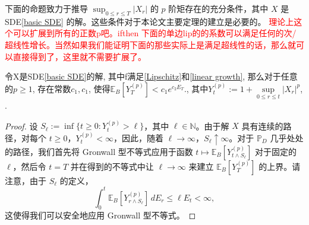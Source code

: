 下面的命题致力于推导 \( \sup_{0 \leq r \leq T} |X_r| \) 的 \( p \) 阶矩存在的充分条件，其中 \( X \) 是 SDE\cref{basic SDE} 的解。这些条件对于本论文主要定理的建立是必要的。
\textcolor{red}{理论上这个可以扩展到所有的正数p吧。ifthen 下面的单边lip的的系数可以满足任何的次/超线性增长。当然如果我们能证明下面的那些实际上是满足超线性的话，那么就可以直接得到了，这里就不需要扩展了。}
\begin{proposition}\label{main pro1}
	令X是SDE\cref{basic SDE}的解, 其中f满足\cref{Lipschitz}和\cref{linear growth}, 那么对于任意的$p \ge 1$, 存在常数$c_1,c_1$, 使得$\mathbb{E}_{B}[Y_T^{(p)}] < c_1 e^{c_2E_T }. $, 其中$Y_t^{(p)} := 1 + \sup\limits_{0\le r\le t}|X_r|^p$, .
\end{proposition}
\begin{proof}
	设 $S_{\ell} := \inf\{ t \geq 0 : Y_{t}^{(p)} > \ell \}$，其中 $\ell \in \mathbb{N}$。由于解 $X$ 具有连续的路径，对每个 $t \geq 0$，$Y_{t}^{(p)} < \infty$，因此，随着 $\ell \to \infty$，$S_{\ell} \uparrow \infty$。对于 $\mathbb{P}_D$ 几乎处处的路径，我们首先将 Gronwall 型不等式应用于函数 $t \mapsto \mathbb{E}_B[Y_{t \wedge S_{\ell}}^{(p)}]$ 对于固定的 $\ell$，然后令 $t = T$ 并在得到的不等式中让 $\ell \to \infty$ 来建立 $\mathbb{E}_B[Y_T^{(p)}]$ 的上界。请注意，由于 $S_{\ell}$ 的定义，
	\[
	\int_{0}^{t} \mathbb{E}_B[Y_{r \wedge S_{\ell}}^{(p)}] \, dE_r \leq \ell E_t < \infty,
	\]
	这使得我们可以安全地应用 Gronwall 型不等式。
	

\end{proof}
